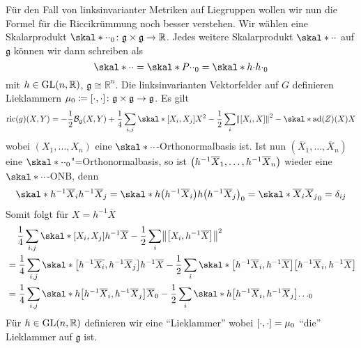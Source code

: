 Für den Fall von linksinvarianter Metriken auf Liegruppen wollen wir nun die Formel für die Riccikrümmung noch besser verstehen.
Wir wählen eine Skalarprodukt $\skal*{\cdot }{\cdot }_0 \colon \mathfrak{g} \times \mathfrak{g} \to \mathbb{R}$.
Jedes weitere Skalarprodukt $\skal*{\cdot }{\cdot}$ auf $\mathfrak{g}$ können wir dann schreiben als
\[
	\skal*{\cdot }{\cdot } = \skal*{P \cdot }{\cdot }_0 = \skal*{h \cdot }{h \cdot }_0
\]
mit $h \in \GL(n,\mathbb{R})$, $\mathfrak{g} \cong \mathbb{R}^n$.
Die linksinvarianten Vektorfelder auf $G$ definieren Lieklammern $\mu_0 \coloneqq \benbrace*{\cdot,\cdot} \colon \mathfrak{g} \times \mathfrak{g} \to \mathfrak{g}$.
Es gilt 
\[
	\ric(g) (X,Y) = - \frac{1}{2} \mathcal{B}_\mathfrak{g}(X,Y) + \frac{1}{4} \sum_{i,j} \skal*{\benbrace*{X_i,X_j}}{X}^2 - \frac{1}{2} \sum_{i} \norm*{\benbrace*{X_i,X}}^2 - \skal*{\ad(Z)(X)}{X}
\]
wobei $(X_1, \ldots ,X_n)$ eine $\skal*{\cdot }{\cdot }$-Orthonormalbasis ist.
Ist nun $(\overline{X}_1, \ldots ,\overline{X}_n)$ eine $\skal*{\cdot }{\cdot }_0$"=Orthonormalbasis, so ist $\enbrace*{h^{-1} \overline{X}_1, \ldots , h^{-1} \overline{X}_n}$ wieder eine $\skal*{\cdot }{\cdot }$-ONB, denn
\[
	\skal*{h^{-1} \overline{X}_i}{h^{-1}\overline{X}_j} = \skal*{h \enbrace*{h^{-1} \overline{X}_i}}{h \enbrace*{h^{-1} \overline{X}_j}}_0 = \skal*{\overline{X}_i}{\overline{X}_j}_0 = \delta_{ij}
\]
Somit folgt für $X= h^{-1} \overline{X}$
\begin{align}
	&\hspace{1em}\, \frac{1}{4}  \sum_{i,j} \skal*{\benbrace*{X_i,X_j}}{h^{-1} \overline{X}} - \frac{1}{2} \sum_i \norm*{\benbrace*{X_i, h^{-1} \overline{X}}}^2 \\
	&= \frac{1}{4} \sum_{i,j} \skal*{ \benbrace*{h^{-1} \overline{X_i}, h^{-1} \overline{X}_j}}{h^{-1} \overline{X}} - \frac{1}{2} \sum_i \skal*{\benbrace*{h^{-1} \overline{X}_i, h^{-1} \overline{X}}}{\benbrace*{h^{-1} \overline{X}_i, h^{-1} \overline{X}}}   \\
	&= \frac{1}{4} \sum_{i,j} \skal*{ h \benbrace*{h^{-1} \overline{X}_i, h^{-1} \overline{X}_j}}{\overline{X}}_0 - \frac{1}{2} \sum_i \skal*{h \benbrace*{h^{-1} \overline{X}_i, h^{-1} \overline{X}_j}}{\ldots }_0 
\end{align}
Für $h \in \GL(n,\mathbb{R})$ definieren wir eine \enquote{Lieklammer}
wobei $\benbrace*{\cdot ,\cdot }= \mu_0$ \enquote{die} Lieklammer auf $\mathfrak{g}$ ist.
